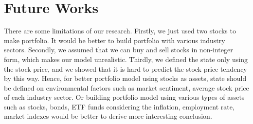 \chapter{Future Works}
\label{Ch:future}

There are some limitations of our research. Firstly, we just used two stocks to make portfolio. It would be better to build portfolio with various industry sectors. Secondly, we assumed that we can buy and sell stocks in non-integer form, which makes our model unrealistic. Thirdly, we defined the state only using the stock price, and we showed that it is hard to predict the stock price tendency by this way. Hence, for better portfolio model using stocks as assets, state should be defined on environmental factors such as market sentiment, average stock price of each industry sector. Or building portfolio model using various types of assets such as stocks, bonds, ETF funds considering the inflation, employment rate, market indexes would be better to derive more interesting conclusion. 
